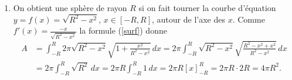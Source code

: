 \documentclass[11pt,class=report,crop=false]{standalone}
\begin{document}
\begin{enumerate}
\begin{enumerate}
		\item 
		On obtient une sphère de rayon $ R $ si on fait tourner la courbe d'équation 
		$ y = f(x) = \sqrt{R^2 - x^2} $, $ x \in [-R, R] $, autour de l'axe des $ x $. 
		Comme $ f'(x) = \frac{-x}{\sqrt{R^2 - x^2}} $ la formule (\ref{surf}) donne 
		\begin{equation*} 
			\begin{split} 
				A 
				&= \int_{-R}^{R} 2 \pi \sqrt{R^2 - x^2} \sqrt{1 + \frac{x^2}{R^2 - x^2}} \, dx 
				= 2 \pi \int_{-R}^{R} \sqrt{R^2 - x^2} \sqrt{\frac{R^2 - x^2 + x^2}{R^2 - x^2}} \, dx \\ 
				&= 2 \pi \int_{-R}^{R} \sqrt{R^2} \, dx 
				= 2 \pi R \int_{-R}^{R} 1 \, dx 
				= 2 \pi R \left[x\right]_{-R}^{R} 
				= 2 \pi R \cdot 2 R 
				= 4 \pi R^2. 
			\end{split} 
		\end{equation*} 
	\end{enumerate} 
\end{enumerate} 
\fincorrection
\finexercice
\end{document}
